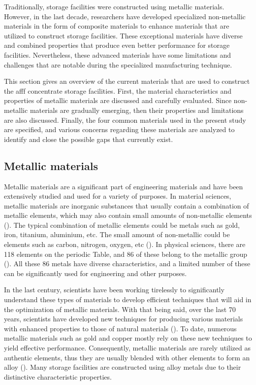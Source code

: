 Traditionally, storage facilities were constructed using metallic materials. However, in the last decade, researchers have developed specialized non-metallic materials in the form of composite materials to enhance materials that are utilized to construct storage facilities. These exceptional materials have diverse and combined properties that produce even better performance for storage facilities. Nevertheless, these advanced materials have some limitations and challenges that are notable during the specialized manufacturing technique.

This section gives an overview of the current materials that are used to construct the \acrshort{afff} concentrate storage facilities. First, the material characteristics and properties of metallic materials are discussed and carefully evaluated. Since non-metallic materials are gradually emerging, then their properties and limitations are also discussed. Finally, the four common materials used in the present study are specified, and various concerns regarding these materials are analyzed to identify and close the possible gaps that currently exist.

\subsection{Metallic materials}
Metallic materials are a significant part of engineering materials and have been extensively studied and used for a variety of purposes.  In material sciences, metallic materials are inorganic substances that usually contain a combination of metallic elements, which may also contain small amounts of non-metallic elements (\cite{ali2020empirical}). The typical combination of metallic elements could be metals such as gold, iron, titanium, aluminium, etc. The small amount of non-metallic could be elements such as carbon, nitrogen, oxygen, etc (\cite{hench2005biomaterials}). In physical sciences, there are 118 elements on the periodic Table, and 86 of these belong to the metallic group (\cite{ali2020empirical}). All these 86 metals have diverse characteristics, and a limited number of these can be significantly used for engineering and other purposes.

In the last century, scientists have been working tirelessly to significantly understand these types of materials to develop efficient techniques that will aid in the optimization of metallic materials. With that being said, over the last 70 years, scientists have developed new techniques for producing various materials with enhanced properties to those of natural materials (\cite{ali2020empirical}). To date, numerous metallic materials such as gold and copper mostly rely on these new techniques to yield effective performance. Consequently, metallic materials are rarely utilized as authentic elements, thus they are usually blended with other elements to form an alloy (\cite{hench2005biomaterials}). Many storage facilities are constructed using alloy metals due to their distinctive characteristic properties.

